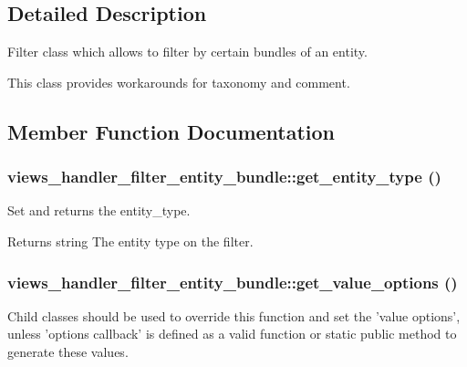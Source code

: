 \subsection{Detailed Description}
Filter class which allows to filter by certain bundles of an entity.

This class provides workarounds for taxonomy and comment. 

\subsection{Member Function Documentation}
\hypertarget{classviews__handler__filter__entity__bundle_a90304eeee421b79a79003a1de1738410}{
\subsubsection[{get\_\-entity\_\-type}]{\setlength{\rightskip}{0pt plus 5cm}views\_\-handler\_\-filter\_\-entity\_\-bundle::get\_\-entity\_\-type ()}}
\label{classviews__handler__filter__entity__bundle_a90304eeee421b79a79003a1de1738410}
Set and returns the entity\_\-type.

\begin{DoxyReturn}{Returns}
string The entity type on the filter. 
\end{DoxyReturn}
\hypertarget{classviews__handler__filter__entity__bundle_afc776cdf6360bbd658c2e918c1da8822}{
\subsubsection[{get\_\-value\_\-options}]{\setlength{\rightskip}{0pt plus 5cm}views\_\-handler\_\-filter\_\-entity\_\-bundle::get\_\-value\_\-options ()}}
\label{classviews__handler__filter__entity__bundle_afc776cdf6360bbd658c2e918c1da8822}
Child classes should be used to override this function and set the 'value options', unless 'options callback' is defined as a valid function or static public method to generate these values.

